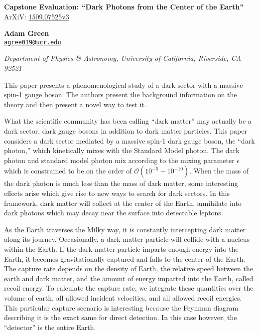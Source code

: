 \documentclass[12pt]{article}
\newcommand{\email}[1]{\href{mailto:#1}{\textcolor{mygreen1}{#1}}}
\newenvironment{institutions}[1][2em]{\begin{list}{}{\setlength\leftmargin{#1}\setlength\rightmargin{#1}}\item[]}{\end{list}}
\begin{document}
	\begin{center}
		{\LARGE \textbf{Capstone Evaluation: ``Dark Photons from the Center of the Earth''}}\\
		
		{ArXiV: \href{https://arxiv.org/abs/1509.07525v3}{\textcolor{mygreen1}{1509.07525v3}}}
		
		\vspace{0.5cm}
		
		\textbf{Adam Green}\\ 
		
		\texttt{\footnotesize \email{agree019@ucr.edu}}
		
		
		\begin{institutions}[2.25cm]
			\footnotesize
			{\it 
				Department of Physics \& Astronomy, 
				University of  California, Riverside, 
				CA 92521	    
			}    
		\end{institutions}
		\vspace{0.5cm}
	\end{center}

	\vspace{0.5cm}
	
	This paper presents a phenomenological study of a dark sector with a massive spin-1 gauge boson. The authors present the background information on the theory and then present a novel way to test it. 

	
	What the scientific community has been calling ``dark matter'' may actually be a dark sector, dark gauge bosons in addition to dark matter particles. This paper considers a dark sector mediated by a massive spin-1 dark gauge boson, the ``dark photon,'' which kinetically mixes with the Standard Model photon. The dark photon and standard model photon mix according to the mixing parameter $\epsilon$ which is constrained to be on the order of $\mathcal{O}(10^{-5} - 10^{-10})$. When the mass of the dark photon is much less than the mass of dark matter, some interesting effects arise which give rise to new ways to search for dark sectors. In this framework, dark matter will collect at the center of the Earth, annihilate into dark photons which may decay near the surface into detectable leptons. 
	
	As the Earth traverses the Milky way, it is constantly intercepting dark matter along its journey. Occasionally, a dark matter particle will collide with a nucleus within the Earth. If the dark matter particle imparts enough energy into the Earth, it becomes gravitationally captured and falls to the center of the Earth. The capture rate depends on the density of Earth, the relative speed between the earth and dark matter, and the amount of energy imparted into the Earth, called recoil energy. To calculate the capture rate, we integrate these quantities over the volume of earth, all allowed incident velocities, and all allowed recoil energies. This particular capture scenario is interesting because the Feynman diagram describing it is the exact same for direct detection. In this case however, the ``detector'' is the entire Earth.
	
\end{document}
